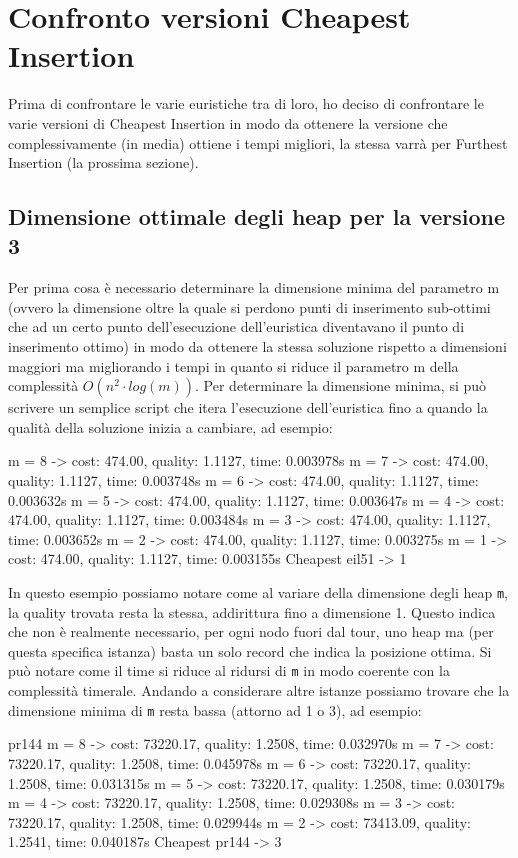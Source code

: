 \documentclass[a4paper,12pt]{report}
\begin{document}
\section{Confronto versioni Cheapest Insertion}
Prima di confrontare le varie euristiche tra di loro, ho deciso di confrontare le varie versioni di Cheapest Insertion in modo da ottenere la versione che complessivamente (in media) ottiene i tempi migliori, la stessa varrà per Furthest Insertion (la prossima sezione). \newline
\subsection{Dimensione ottimale degli heap per la versione 3}
Per prima cosa è necessario determinare la dimensione minima del parametro m (ovvero la dimensione oltre la quale si perdono punti di inserimento sub-ottimi che ad un certo punto dell'esecuzione dell'euristica diventavano il punto di inserimento ottimo) in modo da ottenere la stessa soluzione rispetto a dimensioni maggiori ma migliorando i tempi in quanto si riduce il parametro m della complessità $O(n^2 \cdot log(m))$. Per determinare la dimensione minima, si può scrivere un semplice script che itera l'esecuzione dell'euristica fino a quando la qualità della soluzione inizia a cambiare, ad esempio:
\begin{myverbatim}
m = 8 -> cost: 474.00, quality: 1.1127, time: 0.003978s
m = 7 -> cost: 474.00, quality: 1.1127, time: 0.003748s
m = 6 -> cost: 474.00, quality: 1.1127, time: 0.003632s
m = 5 -> cost: 474.00, quality: 1.1127, time: 0.003647s
m = 4 -> cost: 474.00, quality: 1.1127, time: 0.003484s
m = 3 -> cost: 474.00, quality: 1.1127, time: 0.003652s
m = 2 -> cost: 474.00, quality: 1.1127, time: 0.003275s
m = 1 -> cost: 474.00, quality: 1.1127, time: 0.003155s
Cheapest eil51 -> 1
\end{myverbatim}
In questo esempio possiamo notare come al variare della dimensione degli heap \lstinline!m!, la quality trovata resta la stessa, addirittura fino a dimensione 1. Questo indica che non è realmente necessario, per ogni nodo fuori dal tour, uno heap ma (per questa specifica istanza) basta un solo record che indica la posizione ottima. Si può notare come il time si riduce al ridursi di \lstinline!m! in modo coerente con la complessità timerale. \newline
Andando a considerare altre istanze possiamo trovare che la dimensione minima di \lstinline!m! resta bassa (attorno ad 1 o 3), ad esempio:
\begin{myverbatim}
pr144
m = 8 -> cost: 73220.17, quality: 1.2508, time: 0.032970s
m = 7 -> cost: 73220.17, quality: 1.2508, time: 0.045978s
m = 6 -> cost: 73220.17, quality: 1.2508, time: 0.031315s
m = 5 -> cost: 73220.17, quality: 1.2508, time: 0.030179s
m = 4 -> cost: 73220.17, quality: 1.2508, time: 0.029308s
m = 3 -> cost: 73220.17, quality: 1.2508, time: 0.029944s
m = 2 -> cost: 73413.09, quality: 1.2541, time: 0.040187s
Cheapest pr144 -> 3
\end{myverbatim}
\end{document}
